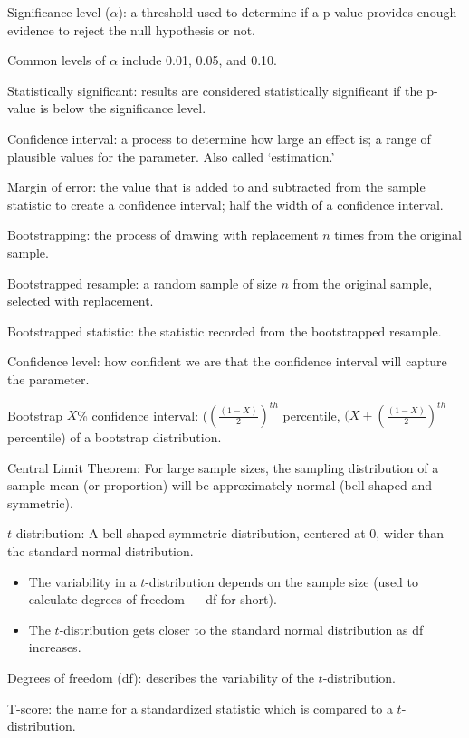 \documentclass[
]{report}
\providecommand{\tightlist}{%
  \setlength{\itemsep}{0pt}\setlength{\parskip}{0pt}}
\newcommand{\rgi}{\hspace{24pt}}  %
\begin{document}
Significance level (\(\alpha\)): a threshold used to determine if a p-value provides enough evidence to reject the null hypothesis or not.

\rgi Common levels of \(\alpha\) include 0.01, 0.05, and 0.10.

Statistically significant: results are considered statistically significant if the p-value is below the significance level.

Confidence interval: a process to determine how large an effect is; a range of plausible values for the parameter. Also called `estimation.'

Margin of error: the value that is added to and subtracted from the sample statistic to create a confidence interval; half the width of a confidence interval.

Bootstrapping: the process of drawing with replacement \(n\) times from the original sample.

Bootstrapped resample: a random sample of size \(n\) from the original sample, selected with replacement.

Bootstrapped statistic: the statistic recorded from the bootstrapped resample.

Confidence level: how confident we are that the confidence interval will capture the parameter.

Bootstrap \(X\)\% confidence interval: (\((\frac{(1-X)}{2})^{th}\) percentile, \((X+(\frac{(1-X)}{2})^{th}\) percentile) of a bootstrap distribution.

Central Limit Theorem: For large sample sizes, the sampling distribution of a sample mean (or proportion) will be approximately normal (bell-shaped and symmetric).

\(t\)-distribution: A bell-shaped symmetric distribution, centered at 0, wider than the standard normal distribution.

\begin{itemize}
\tightlist
\item
  The variability in a \(t\)-distribution depends on the sample size (used to calculate degrees of freedom --- df for short).
\item
  The \(t\)-distribution gets closer to the standard normal distribution as df increases.
\end{itemize}

Degrees of freedom (df): describes the variability of the \(t\)-distribution.

T-score: the name for a standardized statistic which is compared to a \(t\)-distribution.
\end{document}
